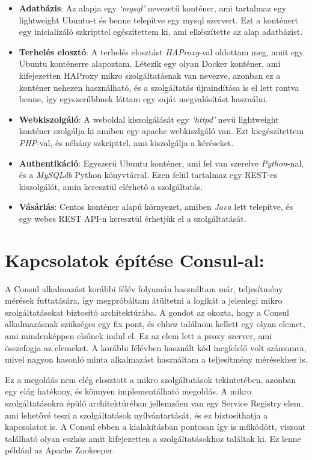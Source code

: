 \documentclass[11pt,magyar,a4paper,oneside,]{report}
\providecommand{\tightlist}{%
  \setlength{\itemsep}{0pt}\setlength{\parskip}{0pt}}
\begin{document}
\begin{itemize}
\tightlist
\item
  \textbf{Adatbázis}: Az alapja egy \emph{`mysql'} nevezetű konténer,
  ami tartalmaz egy lightweight Ubuntu-t és benne telepítve egy mysql
  szervert. Ezt a konténert egy inicializáló szkripttel egészítettem ki,
  ami elkészítette az alap adatbázist.
\item
  \textbf{Terhelés elosztó}: A terhelés elosztást \emph{HAProxy}-val
  oldottam meg, amit egy Ubuntu konténerre alapoztam. Létezik egy olyan
  Docker konténer, ami kifejezetten HAProxy mikro szolgáltatásnak van
  nevezve, azonban ez a konténer nehezen használható, és a szolgáltatás
  újraindítása is el lett rontva benne, így egyszerűbbnek láttam egy
  saját megvalósítást használni.
\item
  \textbf{Webkiszolgáló}: A weboldal kiszolgálását egy \emph{`httpd'}
  nevű lightweight konténer szolgálja ki amiben egy apache webkiszlgáló
  van. Ezt kiegészítettem \emph{PHP}-val, és néhány szkripttel, ami
  kiszolgálja a kéréseket.
\item
  \textbf{Authentikáció}: Egyszerű Ubuntu konténer, ami fel van szerelve
  \emph{Python}-nal, és a \emph{MySQLdb} Python könyvtárral. Ezen felül
  tartalmaz egy REST-es kiszolgálót, amin keresztül elérhető a
  szolgáltatás.
\item
  \textbf{Vásárlás}: Centos konténer alapú környezet, amiben \emph{Java}
  lett telepítve, és egy webes REST API-n keresztül érhetjük el a
  szolgáltatását.
\end{itemize}

\section{Kapcsolatok építése
Consul-al:}\label{kapcsolatok-uxe9puxedtuxe9se-consul-al}

A Consul alkalmazást korábbi félév folyamán használtam már, teljesítmény
mérések futtatására, így megpróbáltam átültetni a logikát a jelenlegi
mikro szolgáltatásokat biztosító architektúrába. A gondot az okozta,
hogy a Consul alkalmazásnak szükséges egy fix pont, és ehhez találnom
kellett egy olyan elemet, ami mindenképpen elsőnek indul el. Ez az elem
lett a proxy szerver, ami összefogja az elemeket. A korábbi félévben
használt kód megfelelő volt számomra, mivel nagyon hasonló minta
alkalmazást használtam a teljesítmény mérésekhez is.

Ez a megoldás nem elég elosztott a mikro szolgáltatások tekintetében,
azonban egy elág hatékony, és könnyen implementálható megoldás. A mikro
szolgáltatásokra épülő architektúréban jellemzően van egy Service
Registry elem, ami lehetővé teszi a szolgáltatások nyílvántartását, és
ez biztosíthatja a kapcsolatot is. A Consul ebben a kialakításban
pontosan így is működött, viszont található olyan eszköz amit
kifejezetten a szolgáltatásokhoz találtak ki. Ez lenne például az Apache
Zookeeper.
\end{document}
